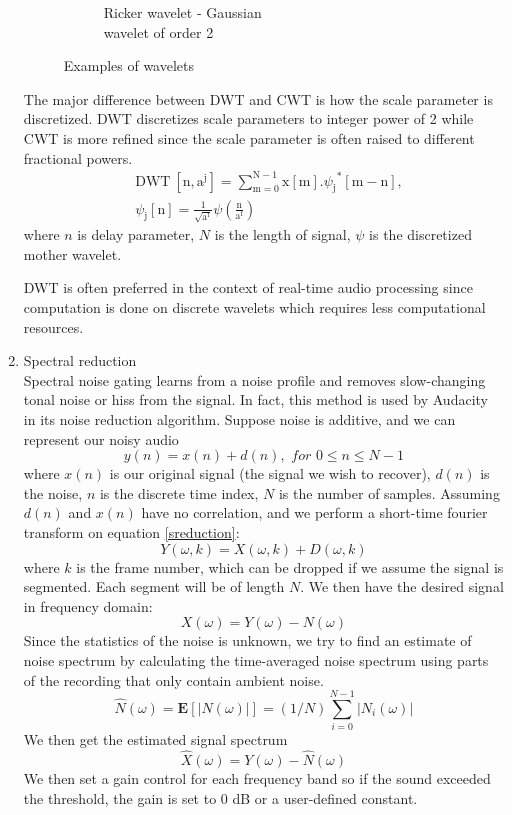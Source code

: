 \begin{enumerate}
\begin{figure}
\begin{subfigure}{.4\textwidth}
		  \caption{Ricker wavelet - Gaussian \\wavelet of order 2}
		  \label{Ricker}
		\end{subfigure}

		\caption{Examples of wavelets}
		\label{fig:test}
	\end{figure}
	
	The major difference between DWT and CWT is how the scale parameter is discretized. DWT discretizes scale parameters to integer power of 2 while CWT is more refined since 
	the scale parameter is often raised to different fractional powers.
	\begin{align*} &\text{DWT}\ [\mathrm{n},\mathrm{a}^{\mathrm{j}}]=\sum_{\mathrm{m}=0}^{\mathrm{N}-1}\mathrm{x}[\mathrm{m}].{\psi_{\mathrm{j}}}^{*}[\mathrm{m}-\mathrm{n}],\\ &\psi_{\mathrm{j}}[\mathrm{n}]=\frac{1}{\sqrt{\mathrm{a}^{\mathrm{f}}}}\psi\left(\frac{\mathrm{n}}{\mathrm{a}^{\mathrm{f}}}\right) \tag{2} \end{align*}
	where $n$ is delay parameter, $N$ is the length of signal, $\psi$ is the discretized mother wavelet. 

	DWT is often preferred in the context of real-time audio processing since computation is done on discrete wavelets which requires less computational resources.
	
	\item Spectral reduction\\
	Spectral noise gating learns from a noise profile and removes slow-changing tonal noise or hiss from the signal. In 
	fact, this method is used by Audacity in its noise reduction algorithm. 
	Suppose noise is additive, and we can represent our noisy audio 
	\[y(n) = x(n) + d(n), \textit{ for } 0 \leq n \leq N-1 \label{sreduction} \]
	where $x(n)$ is our original signal (the signal we wish to recover), $d(n)$ is the noise, $n$ is the discrete time index,
	$N$ is the number of samples. 
	Assuming $d(n)$ and $x(n)$ have no correlation, and we perform a short-time fourier transform on equation \ref{sreduction}:
	\[Y(\omega,k)= X(\omega,k) + D(\omega,k)\]
	where $k$ is the frame number, which can be dropped if we assume the signal is segmented. Each segment will be of
	length $N$. We then have the desired signal in frequency domain:
	\[X(\omega) = Y(\omega) - N(\omega)\]
	Since the statistics of the noise is unknown, we try to find an estimate of noise spectrum by calculating the time-averaged
	noise spectrum using parts of the recording that only contain ambient noise. 
	\[\hat{N}(\omega) = \textbf{E}[|N(\omega)|] = (1/N)\sum_{i=0}^{N-1}|N_i(\omega)|\]
	We then get the estimated signal spectrum
	\[\hat{X}(\omega) = Y(\omega) - \hat{N}(\omega)\]
	We then set a gain control for each frequency band so if the sound exceeded the threshold, the gain is set to 0 dB or a user-defined
	constant.
\end{enumerate}
